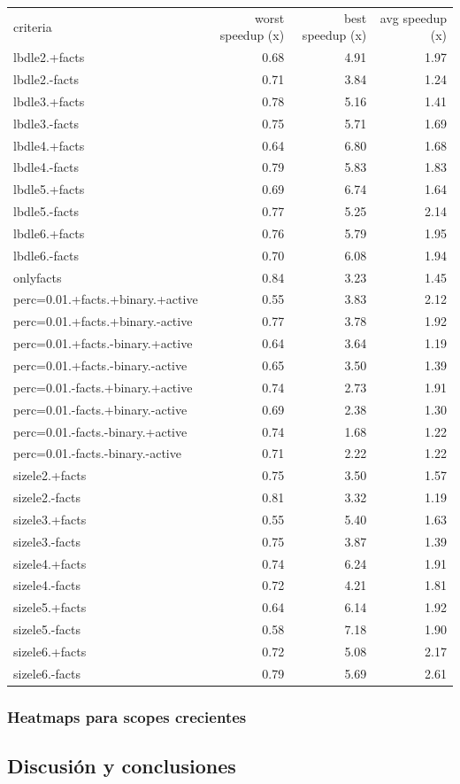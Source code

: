 \hspace{-5em}
\begin{minipage}{\textwidth}
	\small
	\begin{tabular}{lrrr}
		\toprule
		criteria	&	worst speedup (x)	&	best speedup (x)	&	avg speedup (x) \\
		\cmidrule(r){1-4}
		lbdle2.+facts	&	0.68	&	4.91	&	1.97 \\
		lbdle2.-facts	&	0.71	&	3.84	&	1.24 \\
		lbdle3.+facts	&	0.78	&	5.16	&	1.41 \\
		lbdle3.-facts	&	0.75	&	5.71	&	1.69 \\
		lbdle4.+facts	&	0.64	&	6.80	&	1.68 \\
		lbdle4.-facts	&	0.79	&	5.83	&	1.83 \\
		lbdle5.+facts	&	0.69	&	6.74	&	1.64 \\
		lbdle5.-facts	&	0.77	&	5.25	&	2.14 \\
		lbdle6.+facts	&	0.76	&	5.79	&	1.95 \\
		lbdle6.-facts	&	0.70	&	6.08	&	1.94 \\
		\cmidrule(r){1-4}
		onlyfacts	&	\cellcolor{green}0.84	&	3.23	&	1.45 \\
		\cmidrule(r){1-4}
		perc=0.01.+facts.+binary.+active	&	\cellcolor{red}0.55	&	3.83	&	2.12 \\
		perc=0.01.+facts.+binary.-active	&	0.77	&	3.78	&	1.92 \\
		perc=0.01.+facts.-binary.+active	&	0.64	&	3.64	&	\cellcolor{red}1.19 \\
		perc=0.01.+facts.-binary.-active	&	0.65	&	3.50	&	1.39 \\
		perc=0.01.-facts.+binary.+active	&	0.74	&	2.73	&	1.91 \\
		perc=0.01.-facts.+binary.-active	&	0.69	&	2.38	&	1.30 \\
		perc=0.01.-facts.-binary.+active	&	0.74	&	\cellcolor{red}1.68	&	1.22 \\
		perc=0.01.-facts.-binary.-active	&	0.71	&	2.22	&	1.22 \\
		\cmidrule(r){1-4}
		sizele2.+facts	&	0.75	&	3.50	&	1.57 \\
		sizele2.-facts	&	0.81	&	3.32	&	\cellcolor{red}1.19 \\
		sizele3.+facts	&	\cellcolor{red}0.55	&	5.40	&	1.63 \\
		sizele3.-facts	&	0.75	&	3.87	&	1.39 \\
		sizele4.+facts	&	0.74	&	6.24	&	1.91 \\
		sizele4.-facts	&	0.72	&	4.21	&	1.81 \\
		sizele5.+facts	&	0.64	&	6.14	&	1.92 \\
		sizele5.-facts	&	0.58	&	\cellcolor{green}7.18	&	1.90 \\
		sizele6.+facts	&	0.72	&	5.08	&	2.17 \\
		sizele6.-facts	&	0.79	&	5.69	&	\cellcolor{green}2.61 \\
		\bottomrule
	\end{tabular}
\end{minipage}

\subsubsection{Heatmaps para scopes crecientes}


\subsection{Discusión y conclusiones}
